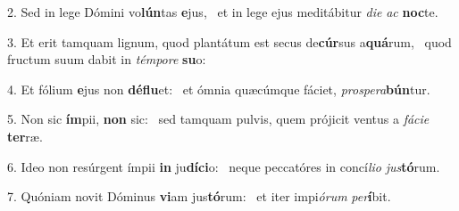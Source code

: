 2. Sed in lege Dómini vo\textbf{lún}tas \textbf{e}jus, \ast\  et in lege ejus meditábitur \textit{di}\textit{e} \textit{ac} \textbf{noc}te.\

3. Et erit tamquam lignum, quod plantátum est secus de\textbf{cúr}sus a\textbf{quá}rum, \ast\  quod fructum suum dabit in \textit{tém}\textit{po}\textit{re} \textbf{su}o:\

4. Et fólium \textbf{e}jus non \textbf{dé}\textbf{flu}et: \ast\  et ómnia quæcúmque fáciet, \textit{pro}\textit{spe}\textit{ra}\textbf{bún}tur.\

5. Non sic \textbf{ím}pii, \textbf{non} sic: \ast\  sed tamquam pulvis, quem prójicit ventus a \textit{fá}\textit{ci}\textit{e} \textbf{ter}ræ.\

6. Ideo non resúrgent ímpii \textbf{in} ju\textbf{dí}\textbf{ci}o: \ast\  neque peccatóres in concí\textit{li}\textit{o} \textit{jus}\textbf{tó}rum.\

7. Quóniam novit Dóminus \textbf{vi}am jus\textbf{tó}rum: \ast\  et iter impi\textit{ó}\textit{rum} \textit{per}\textbf{í}bit.\

